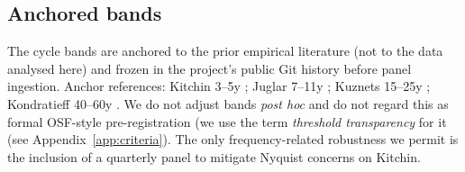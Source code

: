 \subsection{Anchored bands}

The cycle bands are anchored to the prior empirical literature
(not to the data analysed here) and frozen in the project's
public Git history before panel ingestion. Anchor references:
Kitchin 3--5y \citep{kitchin1923,wen2005,diebolt_doliger2008};
Juglar 7--11y \citep{juglar1862,schumpeter1939};
Kuznets 15--25y \citep{kuznets1930,korotayev_tsirel2010};
Kondratieff 40--60y \citep{kondratieff1925,modelski1987,
korotayev_tsirel2010}. We do not adjust bands \emph{post hoc} and
do not regard this as formal OSF-style pre-registration (we use
the term \emph{threshold transparency} for it
(see Appendix~\ref{app:criteria}). The only frequency-related
robustness we permit is the inclusion of a quarterly panel to
mitigate Nyquist concerns on Kitchin.
